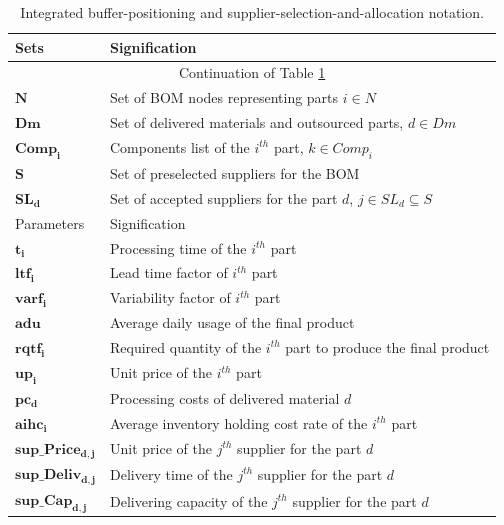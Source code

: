 \documentclass[preprint,12pt,authoryear]{elsarticle}
\begin{document}
\begin{longtable}{@{}p{}p{}@{}}
\caption{Integrated buffer-positioning and supplier-selection-and-allocation notation.}\label{tabNot3}\\

 \hline\hline
Sets &  Signification\\
 \hline
 \endfirsthead

 \hline
 \multicolumn{2}{c}{Continuation of Table \ref{tabNot3}}\\
 \hline
 \endhead

 \hline
 \endfoot

 \hline\hline
 \endlastfoot

    $\bm{N}$ & Set of BOM nodes representing parts $i\in N$\\
    $\bm{Dm}$ & Set of delivered materials and outsourced parts, $d\in Dm$\\
    $\bm{Comp_{i}}$ & Components list of the $i^{th}$ part, $k\in Comp_{i}$\\
    $\bm{S}$ & Set of preselected suppliers for the BOM\\
    $\bm{SL_{d}}$ & Set of accepted suppliers for the part $d$, $j\in SL_{d}\subseteq S$\\
\hline
Parameters &  Signification\\
\hline
    $\bm{t_{i}}$ & Processing time of the $i^{th}$ part\\
    $\bm{ltf_{i}}$ & Lead time factor of $i^{th}$ part\\
    $\bm{varf_{i}}$ & Variability factor of $i^{th}$ part\\
    $\bm{adu}$ & Average daily usage of the final product\\
    $\bm{rqtf_{i}}$ & Required quantity of the $i^{th}$ part to produce the final product\\
    $\bm{up_{i}}$ & Unit price of the $i^{th}$ part\\
    $\bm{pc_{d}}$ & Processing costs of delivered material $d$\\
    $\bm{aihc_{i}}$ & Average inventory holding cost rate of the $i^{th}$ part\\
    $\bm{sup\_Price_{d,j}}$ & Unit price of the $j^{th}$ supplier for the part $d$\\
    $\bm{sup\_Deliv_{d,j}}$ & Delivery time of the $j^{th}$ supplier for the part $d$\\
    $\bm{sup\_Cap_{d,j}}$ & Delivering capacity of the $j^{th}$ supplier for the part $d$\\

\end{longtable}
\end{document}
